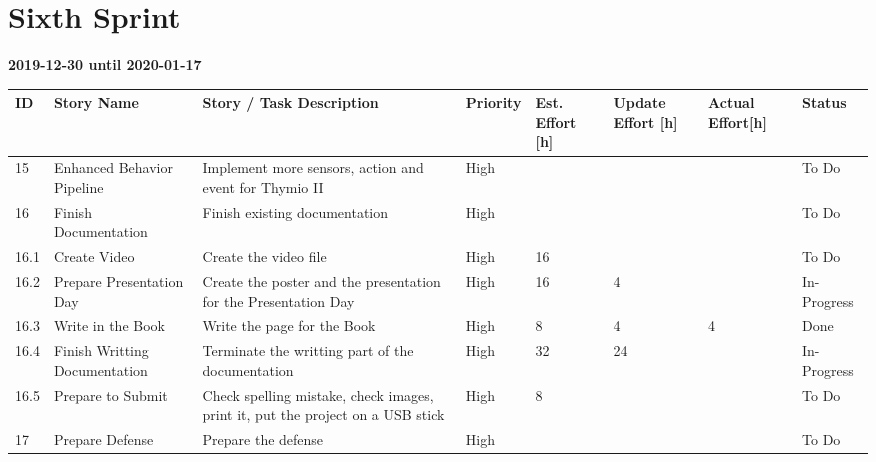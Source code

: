 \documentclass{scrbook}
\begin{document}
\section{Sixth Sprint}
\textbf{2019-12-30 until 2020-01-17}
\begin{longtable}{p{5mm}|p{2cm}|p{4cm}|p{1cm}|p{1cm}|p{1cm}|p{1cm}|p{15mm}}
  ID                     & Story Name & Story / Task Description & Priority & Est. Effort {[}h{]} & Update Effort {[}h{]} & Actual Effort{[}h{]} & Status                \\ \hline
  15 & Enhanced Behavior Pipeline & Implement more sensors, action and event for Thymio II & High &  &  &  & To Do \\ 
  16 & Finish Documentation & Finish existing documentation & High &  &  &  & To Do \\
  16.1 & Create Video & Create the video file & High & 16 &  &  & To Do \\ 
  16.2 & Prepare Presentation Day & Create the poster and the presentation for the Presentation Day & High & 16 & 4 &  & In-Progress \\
  16.3 & Write in the Book & Write the page for the Book & High & 8 & 4 & 4 & Done \\ 
  16.4 & Finish Writting Documentation & Terminate the writting part of the documentation & High & 32 & 24 &  & In-Progress \\ 
  16.5 & Prepare to Submit & Check spelling mistake, check images, print it, put the project on a USB stick & High & 8 &  &  & To Do\\ 
  17 & Prepare Defense & Prepare the defense & High &  &  &  & To Do \\ \hline
\end{longtable}
\end{document}
